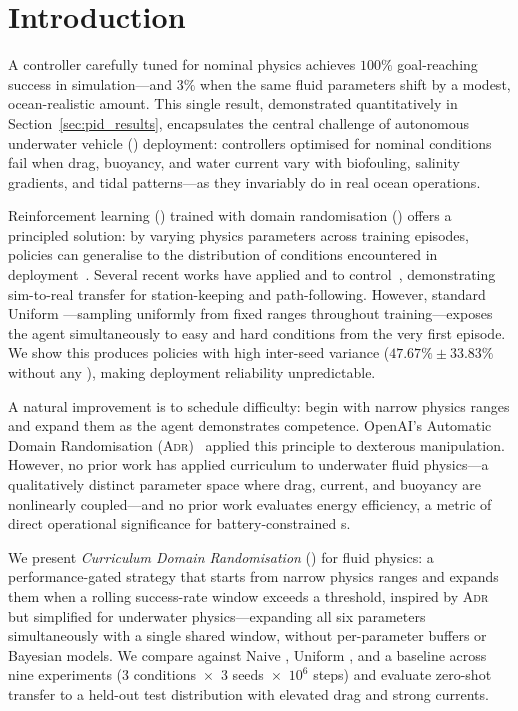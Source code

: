 
\section{Introduction}
\label{sec:intro}

A \PID{} controller carefully tuned for nominal \AUV{} physics achieves
$100\%$ goal-reaching success in simulation---and $3\%$ when the same
fluid parameters shift by a modest, ocean-realistic amount.
This single result, demonstrated quantitatively in
Section~\ref{sec:pid_results}, encapsulates the central challenge of
autonomous underwater vehicle (\AUV{}) deployment: controllers
optimised for nominal conditions fail when drag, buoyancy, and water
current vary with biofouling, salinity gradients, and tidal
patterns---as they invariably do in real ocean operations.

Reinforcement learning (\RL{}) trained with domain randomisation (\DR{})
offers a principled solution: by varying physics parameters across
training episodes, policies can generalise to the distribution of
conditions encountered in deployment~\cite{tobin2017,peng2018}.
Several recent works have applied \SAC{} and \DR{} to \AUV{}
control~\cite{arndt2024,chu2025,chaffre2025}, demonstrating
sim-to-real transfer for station-keeping and path-following.
However, standard Uniform \DR{}---sampling uniformly from fixed ranges
throughout training---exposes the agent simultaneously to easy and hard
conditions from the very first episode.
We show this produces policies with high inter-seed variance
($47.67\% \pm 33.83\%$ without any \DR{}),
making deployment reliability unpredictable.

A natural improvement is to schedule \DR{} difficulty: begin with
narrow physics ranges and expand them as the agent demonstrates
competence.
OpenAI's Automatic Domain Randomisation (\textsc{Adr})~\cite{akkaya2019}
applied this principle to dexterous manipulation.
However, no prior work has applied curriculum \DR{} to underwater fluid
physics---a qualitatively distinct parameter space where drag, current,
and buoyancy are nonlinearly coupled---and no prior work evaluates
energy efficiency, a metric of direct operational significance for
battery-constrained \AUV{}s.

We present \emph{Curriculum Domain Randomisation} (\CDR{}) for \AUV{}
fluid physics: a performance-gated strategy that starts from narrow
physics ranges and expands them when a rolling success-rate window
exceeds a threshold, inspired by \textsc{Adr}~\cite{akkaya2019} but
simplified for underwater physics---expanding all six parameters
simultaneously with a single shared window, without per-parameter
buffers or Bayesian models.
We compare \CDR{} against Naive \SAC{}, Uniform \DR{}, and a \PID{}
baseline across nine experiments ($3$ conditions~$\times$~$3$
seeds~$\times$~$10^6$ steps) and evaluate zero-shot transfer to
a held-out test distribution with elevated drag and strong currents.

